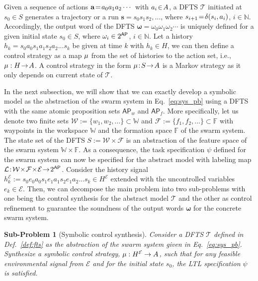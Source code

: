 \documentclass[letterpaper, 10 pt, conference]{ieeeconf}
\newtheorem{subproblem}{Sub-Problem}
\begin{document}
	Given a sequence of actions $\mathbf{a} \!=\! a_0 a_1 a_2 \cdots$ with $a_i \!\in\! {A}$, %
	a DFTS $\mathcal{T}$ initiated at $s_0 \!\in\! S$ generates a trajectory or a run $\pmb{s} \!=\! s_0 s_1 s_2, \ldots$, where $s_{i+1}\!=\!\delta(s_i,a_i)$, $i \!\in\! \mathbb{N}$. Accordingly, the output word of the DFTS $\pmb \omega = \omega_0 \omega_1 \omega_2 \cdots$ is uniquely defined for a given initial state $s_0 \in S$, where $\omega_i \in 2^{\mathsf{AP}}$, $i \in \mathbb{N}$.
Let a history $h_k = s_0 a_0 s_1 a_1  s_2 a_2...s_k$ be given at time $k$ with $h_k\!\in\! H$, we can then define a control strategy as a map $\mu$ from the set of histories to the action set, i.e., $\mu: H \!\rightarrow\! {A}$.
A control strategy in the form  $\mu\!:\! S \!\rightarrow\! {A}$ is a Markov strategy as it only depends on current state of $\mathcal{T}$.

\smallskip

In the next subsection, we will show that we can exactly develop a symbolic model as the abstraction of the swarm system in Eq.~\eqref{eq:sys_pb} using a DFTS with the same atomic proposition sets $ \mathsf{AP}_w$ and $\mathsf{AP}_f$. %
More specifically, let us denote two finite sets $\mathcal{W}\!:=\!\{w_1,w_2,\ldots\}\!\subset\!\mathbb W$ and $\mathcal{F}\!:=\!\{f_1,f_2,\ldots\}\!\subset\!\mathbb F$ with waypoints in the workspace $\mathbb W$ and the formation space $\mathbb F$ of the swarm system. %
The state set of the DFTS $S\!:=\mathcal{W}\!\times\!\mathcal{F}$ is an abstraction of the feature space of the swarm system $\mathbb{W}\times \mathbb{F}$. As a consequence, the task specification $\psi$ defined for the swarm system can now be specified for the abstract model with labeling map ${\mathcal{L}}\!:\!\mathcal{W}\!\times\!\mathcal{F} \!\times\!\mathcal{E} \!\rightarrow\!2^{\AP}$. Consider the history signal $h_k^{\mathcal{E}}\!:=\!s_0 e_0 a_0 s_1 e_1 a_1  s_2e_1 a_2...s_k\!\in\! H^{\mathcal{E}}$ extended with the uncontrolled variables $e_k\in \mathcal E$. Then, we can decompose the main problem into two sub-problems with one being the control synthesis for the abstract model $\mathcal{T}$ and the other as control refinement to guarantee the soundness of the output words $\pmb{\omega}$ for the concrete swarm system.


\begin{subproblem}[Symbolic control synthesis]
\label{spb:strategy}
Consider a DFTS $\mathcal{T}$ defined in Def.~\ref{def:fts} as the abstraction of the swarm system given in Eq.~\eqref{eq:sys_pb}. Synthesize a symbolic control strategy, $\mu: H^\mathcal{E} \rightarrow A$, such that for any feasible environmental signal from $\mathcal{E}$ and for the initial state $s_0$, the LTL specification $\psi$ is satisfied.
\end{subproblem}
\end{document}
